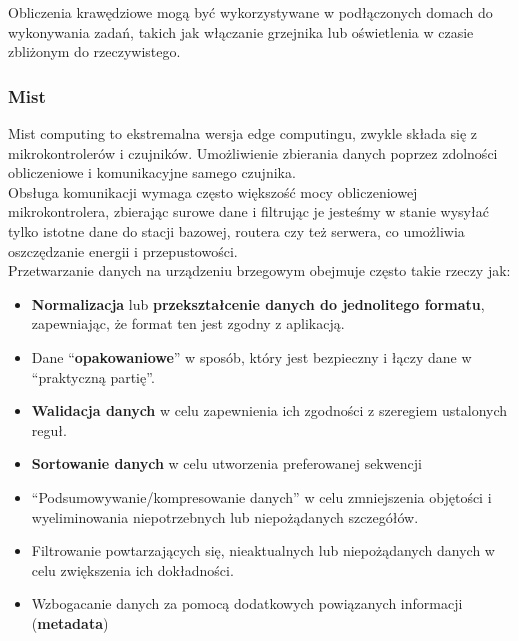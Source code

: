 Obliczenia krawędziowe mogą być wykorzystywane w podłączonych domach do wykonywania zadań, takich jak włączanie grzejnika lub oświetlenia w czasie zbliżonym do rzeczywistego.

\subsubsection{Mist}

Mist computing to ekstremalna wersja edge computingu, zwykle składa się z mikrokontrolerów i czujników. Umożliwienie zbierania danych poprzez zdolności obliczeniowe i komunikacyjne samego czujnika. \\

Obsługa komunikacji wymaga często większość mocy obliczeniowej mikrokontrolera, zbierając surowe dane i filtrując je jesteśmy w stanie wysyłać tylko istotne dane do stacji bazowej, routera czy też serwera, co umożliwia oszczędzanie energii i przepustowości. \\

Przetwarzanie danych na urządzeniu brzegowym obejmuje często takie rzeczy jak:

\begin{itemize}
	\item \textbf{Normalizacja} lub \textbf{przekształcenie danych do jednolitego formatu}, zapewniając, że format ten jest zgodny z aplikacją.
	\item Dane “\textbf{opakowaniowe}” w sposób, który jest bezpieczny i łączy dane w “praktyczną partię”.
	\item \textbf{Walidacja danych} w celu zapewnienia ich zgodności z szeregiem ustalonych reguł.
	\item \textbf{Sortowanie danych} w celu utworzenia preferowanej sekwencji
	\item “Podsumowywanie/kompresowanie danych” w celu zmniejszenia objętości i wyeliminowania niepotrzebnych lub niepożądanych szczegółów.
	\item Filtrowanie powtarzających się, nieaktualnych lub niepożądanych danych w celu zwiększenia ich dokładności.
	\item Wzbogacanie danych za pomocą dodatkowych powiązanych informacji (\textbf{metadata})
\end{itemize}
